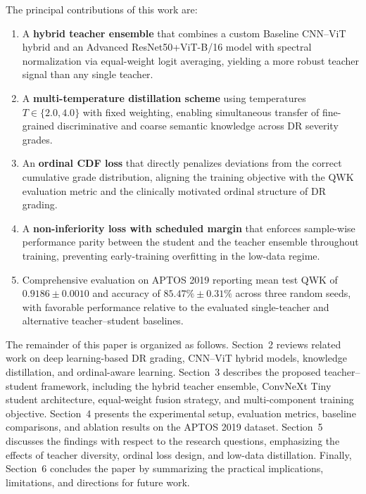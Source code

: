 \documentclass[a4paper,fleqn]{cas-dc}
\begin{document}
The principal contributions of this work are:

\begin{enumerate}
    \item A \textbf{hybrid teacher ensemble} that combines a custom Baseline CNN--ViT hybrid and an Advanced ResNet50+ViT-B/16 model with spectral normalization via equal-weight logit averaging, yielding a more robust teacher signal than any single teacher.
    \item A \textbf{multi-temperature distillation scheme} using temperatures $T \in \{2.0, 4.0\}$ with fixed weighting, enabling simultaneous transfer of fine-grained discriminative and coarse semantic knowledge across DR severity grades.
    \item An \textbf{ordinal CDF loss} that directly penalizes deviations from the correct cumulative grade distribution, aligning the training objective with the QWK evaluation metric and the clinically motivated ordinal structure of DR grading.
    \item A \textbf{non-inferiority loss with scheduled margin} that enforces sample-wise performance parity between the student and the teacher ensemble throughout training, preventing early-training overfitting in the low-data regime.
    \item Comprehensive evaluation on APTOS 2019 reporting mean test QWK of $\mathbf{0.9186 \pm 0.0010}$ and accuracy of $\mathbf{85.47\% \pm 0.31\%}$ across three random seeds, with favorable performance relative to the evaluated single-teacher and alternative teacher--student baselines.

\end{enumerate}

The remainder of this paper is organized as follows. Section~2 reviews related work on deep learning-based DR grading, CNN--ViT hybrid models, knowledge distillation, and ordinal-aware learning. Section~3 describes the proposed teacher--student framework, including the hybrid teacher ensemble, ConvNeXt Tiny student architecture, equal-weight fusion strategy, and multi-component training objective. Section~4 presents the experimental setup, evaluation metrics, baseline comparisons, and ablation results on the APTOS 2019 dataset. Section~5 discusses the findings with respect to the research questions, emphasizing the effects of teacher diversity, ordinal loss design, and low-data distillation. Finally, Section~6 concludes the paper by summarizing the practical implications, limitations, and directions for future work.
\end{document}
